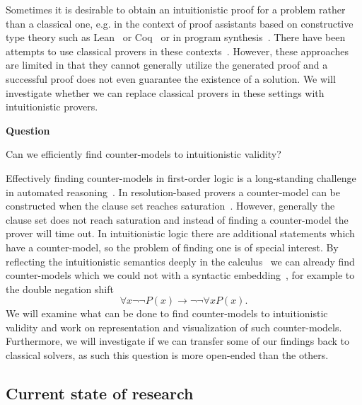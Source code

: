 \documentclass{article}
\theoremstyle{definition}
\theoremstyle{definition}
\theoremstyle{definition}
\theoremstyle{definition}
\theoremstyle{definition}
\theoremstyle{definition}
\theoremstyle{definition}
\newcommand{\0}{\mathbf 0}
\newcommand{\1}{\mathbf 1}
\newcounter{question}
\newenvironment{question}{\smallskip\noindent\textbf{Question \refstepcounter{question}\arabic{question}}\begin{em}}{\end{em}}
\newenvironment{method}{\smallskip}{}
\begin{document}
	\begin{method}
		Sometimes it is desirable to obtain an intuitionistic proof for a problem rather than a classical one, e.g. in the context of proof assistants based on constructive type theory such as Lean~\cite{de2015lean} or Coq~\cite{bertot2013interactive} or in program synthesis~\cite{alur2013syntax}. There have been attempts to use classical provers in these contexts~\cite{czajka2018hammer,hozzova2023program}. However, these approaches are limited in that they cannot generally utilize the generated proof and a successful proof does not even guarantee the existence of a solution. We will investigate whether we can replace classical provers in these settings with intuitionistic provers. 
	\end{method}

	\vspace*{12pt}

	\begin{question}
		Can we efficiently find counter-models to intuitionistic validity?
	\end{question}

	\begin{method}
		Effectively finding counter-models in first-order logic is a long-standing challenge in automated reasoning~\cite{caferra1992method}. In resolution-based provers a counter-model can be constructed when the clause set reaches saturation~\cite{peltier2003model}. However, generally the clause set does not reach saturation and instead of finding a counter-model the prover will time out. In intuitionistic logic there are additional statements which have a counter-model, so the problem of finding one is of special interest. By reflecting the intuitionistic semantics deeply in the calculus~\cite{otten2005clausal} we can already find counter-models which we could not with a syntactic embedding~\cite{pluska2023embedding}, for example to the double negation shift
		\[\forall x\neg\neg P(x)\to\neg\neg\forall xP(x).\]
		We will examine what can be done to find counter-models to intuitionistic validity and work on representation and visualization of such counter-models. Furthermore, we will investigate if we can transfer some of our findings back to classical solvers, as such this question is more open-ended than the others.
	\end{method}

	\subsection{Current state of research}
\end{document}
